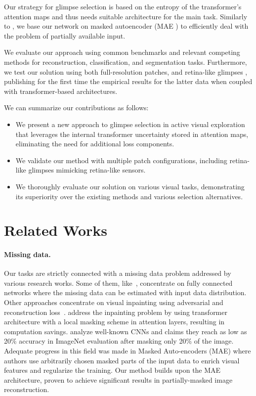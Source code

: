 \documentclass{article}
\begin{document}
Our strategy for glimpse selection is based on the entropy of the transformer's attention maps and thus needs suitable architecture for the main task. Similarly to \cite{Jha2023WACV}, we base our network on masked autoencoder (MAE \cite{he2022masked}) to efficiently deal with the problem of partially available input.%

We evaluate our approach using common benchmarks and relevant competing methods for reconstruction, classification, and segmentation tasks. Furthermore, we test our solution using both full-resolution patches, and retina-like glimpses \cite{sandini2003retina}, publishing for the first time the empirical results for the latter data when coupled with transformer-based architectures.

We can summarize our contributions as follows:
\begin{itemize}
    \item We present a new approach to glimpse selection in active visual exploration that leverages the internal transformer uncertainty stored in attention maps, eliminating the need for additional loss components.
    \item We validate our method with multiple patch configurations, including retina-like glimpses mimicking retina-like sensors. %
    \item We thoroughly evaluate our solution on various visual tasks, demonstrating its superiority over the existing methods and various selection alternatives.
\end{itemize}

\section{Related Works}

\paragraph{Missing data.}
Our tasks are strictly connected with a missing data problem addressed by various research works. Some of them, like~\cite{smieja2018processing}, concentrate on fully connected networks where the missing data can be estimated with input data distribution. Other approaches concentrate on visual inpainting using adversarial and reconstruction loss~\cite{pathak2016context}. \cite{li2022mat} address the inpainting problem by using transformer architecture with a local masking scheme in attention layers, resulting in computation savings. \cite{naseer2021visionTransformers} analyze well-known CNNs and claims they reach as low as 20\% accuracy in ImageNet evaluation after masking only 20\% of the image. Adequate progress in this field was made in Masked Auto-encoders (MAE) \cite{he2022masked} where authors use arbitrarily chosen masked parts of the input data to enrich visual features and regularize the training. Our method builds upon the MAE architecture, proven to achieve significant results in partially-masked image reconstruction.
\end{document}
